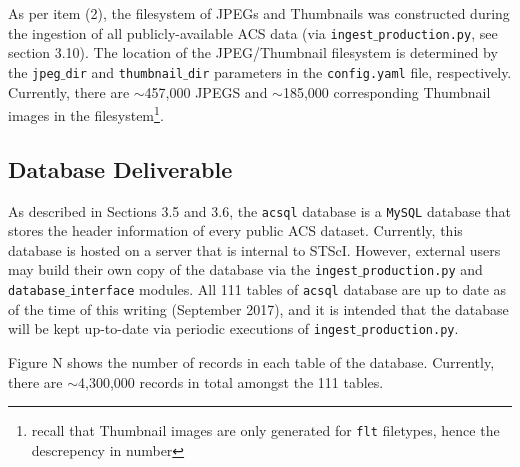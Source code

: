 \documentclass[10pt,journal,compsoc]{IEEEtran}
\begin{document}
As per item (2), the filesystem of JPEGs and Thumbnails was constructed during the ingestion of all publicly-available
ACS data (via \texttt{ingest$\_$production.py}, see section 3.10).  The location of the JPEG/Thumbnail filesystem is determined
by the \texttt{jpeg$\_$dir} and \texttt{thumbnail$\_$dir} parameters in the \texttt{config.yaml} file, respectively.
Currently, there are $\sim$457,000 JPEGS and $\sim$185,000 corresponding Thumbnail images in the filesystem\footnote{recall that Thumbnail
images are only generated for \texttt{flt} filetypes, hence the descrepency in number}.


\subsection{Database Deliverable}

As described in Sections 3.5 and 3.6, the \texttt{acsql} database is a \texttt{MySQL} database that stores the header
information of every public ACS dataset.  Currently, this database is hosted on a server that is internal to STScI.  However,
external users may build their own copy of the database via the \texttt{ingest$\_$production.py} and \texttt{database$\_$interface}
modules.  All 111 tables of \texttt{acsql} database are up to date as of the time of this writing (September 2017), and it is
intended that the database will be kept up-to-date via periodic executions of \texttt{ingest$\_$production.py}.

Figure N shows the number of records in each table of the database.  Currently, there are $\sim$4,300,000 records in total amongst
the 111 tables.
\end{document}
